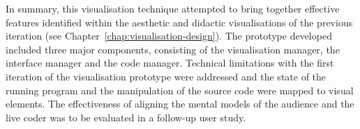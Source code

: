In summary, this visualisation technique attempted to bring together effective features identified within the aesthetic and didactic visualisations of the previous iteration (see Chapter~\ref{chap:visualisation-design}). The prototype developed included three major components, consisting of the visualisation manager, the interface manager and the code manager. Technical limitations with the first iteration of the visualisation prototype were addressed and the state of the running program and the manipulation of the source code were mapped to visual elements. The effectiveness of aligning the mental models of the audience and the live coder was to be evaluated in a follow-up user study.


